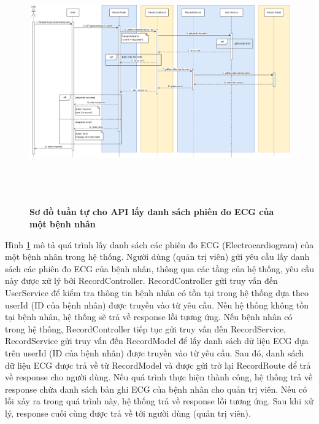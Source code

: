 \begin{figure}[H]
  \centering
  \includegraphics[width=16cm,height=10.5cm]{Images/sequence_api/getRecordsByUser.png}
  \caption[Sơ đồ tuần tự cho API lấy danh sách phiên đo ECG của một bệnh nhân ]{\bfseries \fontsize{12pt}{0pt}
  \selectfont Sơ đồ tuần tự cho API lấy danh sách phiên đo ECG của một bệnh nhân }
  \label{api_getRecordsByUser} %
\end{figure}
Hình \ref{api_getRecordsByUser} mô tả quá trình lấy danh sách các phiên đo ECG (Electrocardiogram) của một bệnh nhân trong hệ thống. Người dùng (quản trị viên) gửi yêu cầu lấy danh sách các phiên đo ECG của bệnh nhân, thông qua các tầng của hệ thống, 
yêu cầu này được xử lý bởi RecordController. RecordController gửi truy vấn đến UserService để kiểm tra thông tin bệnh nhân có tồn tại trong hệ thống dựa theo userId (ID của bệnh nhân) được truyền vào từ yêu cầu. Nếu hệ thống không tồn tại bệnh nhân, hệ thống sẽ
trả về response lỗi tương ứng. Nếu bệnh nhân có trong hệ thống, RecordController tiếp tục gửi truy vấn đến RecordService, RecordService gửi truy vấn đến RecordModel để lấy danh sách dữ liệu ECG dựa trên userId (ID của bệnh nhân) được truyền vào từ yêu cầu. 
Sau đó, danh sách dữ liệu ECG được trả về từ RecordModel và được gửi trở lại RecordRoute để trả về response cho người dùng. Nếu quá trình thực hiện thành công, hệ thống trả về response chứa danh sách bản ghi ECG của bệnh nhân cho quản trị viên. Nếu có lỗi xảy ra
 trong quá trình này, hệ thống trả về response lỗi tương ứng. Sau khi xử lý, response cuối cùng được trả về tới người dùng (quản trị viên).

